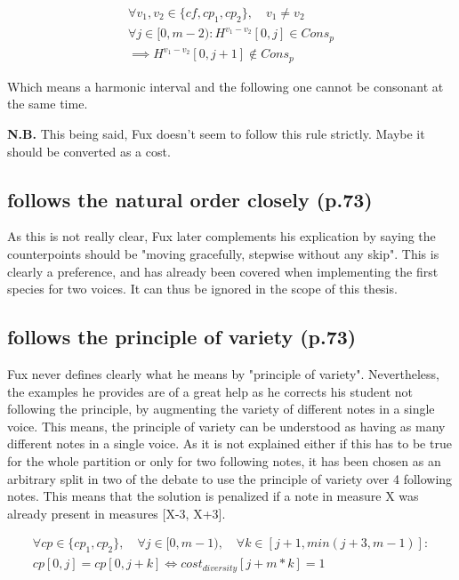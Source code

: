 \begin{equation} \begin{aligned}
\forall v_1, v_2 \in \{cf, cp_1, cp_2\}, \quad v_1 \neq v_2 \quad \\
\forall j \in [0, m-2) \colon H^{v_1-v_2}[0, j] \in Cons_p \\
\implies H^{v_1-v_2}[0, j+1] \notin Cons_p
\end{aligned} \end{equation}

Which means a harmonic interval and the following one cannot be consonant at the same time.

\textbf{N.B.} This being said, Fux doesn't seem to follow this rule strictly. Maybe it should be converted as a cost.

\subsection{ follows the natural order closely (p.73)}
As this is not really clear, Fux later complements his explication by saying the counterpoints should be "moving gracefully, stepwise without any skip". This is clearly a preference, and has already been covered when implementing the first species for two voices. It can thus be ignored in the scope of this thesis.

\subsection{ follows the principle of variety (p.73)}
Fux never defines clearly what he means by "principle of variety". Nevertheless, the examples he provides are of a great help as he corrects his student not following the principle, by augmenting the variety of different notes in a single voice. This means, the principle of variety can be understood as having as many different notes in a single voice. As it is not explained either if this has to be true for the whole partition or only for two following notes, it has been chosen as an arbitrary split in two of the debate to use the principle of variety over 4 following notes. This means that the solution is penalized if a note in measure X was already present in measures [X-3, X+3].

\begin{equation} \begin{aligned}
\forall cp \in \{cp_1, cp_2\}, \quad \forall j \in [0, m-1), \quad \forall k \in [j+1, min(j+3, m-1)] :\\ cp[0, j] = cp[0, j+k]\iff cost_{diversity}[j+m*k]= 1
\end{aligned} \end{equation}

